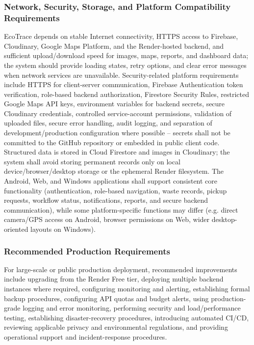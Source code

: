 \subsubsection{Network, Security, Storage, and Platform Compatibility
Requirements}
EcoTrace depends on stable Internet connectivity, HTTPS access to Firebase,
Cloudinary, Google Maps Platform, and the Render-hosted backend, and
sufficient upload/download speed for images, maps, reports, and dashboard
data; the system should provide loading states, retry options, and clear error
messages when network services are unavailable. Security-related platform
requirements include HTTPS for client-server communication, Firebase
Authentication token verification, role-based backend authorization, Firestore
Security Rules, restricted Google Maps API keys, environment variables for
backend secrets, secure Cloudinary credentials, controlled service-account
permissions, validation of uploaded files, secure error handling, audit
logging, and separation of development/production configuration where
possible -- secrets shall not be committed to the GitHub repository or
embedded in public client code. Structured data is stored in Cloud Firestore
and images in Cloudinary; the system shall avoid storing permanent records
only on local device/browser/desktop storage or the ephemeral Render
filesystem. The Android, Web, and Windows applications shall support
consistent core functionality (authentication, role-based navigation, waste
records, pickup requests, workflow status, notifications, reports, and secure
backend communication), while some platform-specific functions may differ
(e.g. direct camera/GPS access on Android, browser permissions on Web,
wider desktop-oriented layouts on Windows).

\subsubsection{Recommended Production Requirements}
For large-scale or public production deployment, recommended
improvements include upgrading from the Render Free tier, deploying
multiple backend instances where required, configuring monitoring and
alerting, establishing formal backup procedures, configuring API quotas and
budget alerts, using production-grade logging and error monitoring,
performing security and load/performance testing, establishing
disaster-recovery procedures, introducing automated CI/CD, reviewing
applicable privacy and environmental regulations, and providing operational
support and incident-response procedures.

